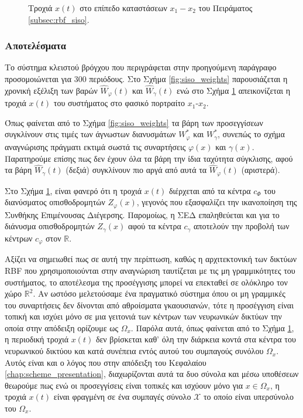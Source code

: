 {
\begin{figure}
	
	\captionsetup{format=plain}
	\caption{Τροχιά $x(t)$ στο επίπεδο καταστάσεων $x_1 - x_2$ του Πειράματος \ref{subsec:rbf_siso}.}
	\label{fig:phase_plain}	
\end{figure}

\subsubsection{Αποτελέσματα}
Το σύστημα κλειστού βρόγχου που περιγράφεται στην προηγούμενη παράγραφο προσομοιώνεται για 300 περιόδους. Στο Σχήμα \ref{fig:siso_weights} παρουσιάζεται η χρονική εξέλιξη των βαρών $\hat{W}_{\varphi}(t)$ και $\hat{W}_{\gamma}(t)$ ενώ στο Σχήμα \ref{fig:phase_plain} απεικονίζεται η τροχιά $x(t)$ του συστήματος στο φασικό πορτραίτο $x_1$-$x_2$.

Όπως φαίνεται από το Σχήμα \ref{fig:siso_weights} τα βάρη των προσεγγίσεων συγκλίνουν στις τιμές των άγνωστων διανυσμάτων $W_\varphi^*$ και $W_\gamma^*$, συνεπώς το σχήμα αναγνώρισης πράγματι εκτιμά σωστά τις συναρτήσεις $\varphi(x)$ και $\gamma(x)$. Παρατηρούμε επίσης πως δεν έχουν όλα τα βάρη την ίδια ταχύτητα σύγκλισης, αφού τα βάρη $\hat{W}_{\gamma}(t)$ (δεξιά) συγκλίνουν πιο αργά από αυτά τα $\hat{W}_{\varphi}(t)$ (αριστερά).

}

Στο Σχήμα \ref{fig:phase_plain}, είναι φανερό ότι η τροχιά $x(t)$ διέρχεται από τα κέντρα $c_\Phi$ του διανύσματος οπισθοδρομητών $Z_\varphi(x)$, γεγονός που εξασφαλίζει την ικανοποίηση της Συνθήκης Επιμένουσας Διέγερσης. Παρομοίως, η ΣΕΔ επαληθεύεται και για το διάνυσμα οπισθοδρομητών $Z_\gamma(x)$ αφού τα κέντρα $c_\gamma$ αποτελούν την προβολή των κέντρων $c_\varphi$ στον $\mathbb{R}$.

Αξίζει να σημειωθεί πως σε αυτή την περίπτωση, καθώς η αρχιτεκτονική των δικτύων RBF που χρησιμοποιούνται στην αναγνώριση ταυτίζεται με τις μη γραμμικότητες του συστήματος, το αποτέλεσμα της προσέγγισης μπορεί να επεκταθεί σε ολόκληρο τον χώρο $\mathbb{R}^2$. Αν ωστόσο μελετούσαμε ένα πραγματικό σύστημα όπου οι μη γραμμικές του συναρτήσεις δεν δίνονται από αθροίσματα γκαουσιανών, τότε η προσέγγιση είναι τοπική και ισχύει μόνο σε μια γειτονιά των κέντρων των νευρωνικών δικτύων την οποία στην απόδειξη ορίζουμε ως $\Omega_x$. Παρόλα αυτά, όπως φαίνεται από το Σχήμα \ref{fig:phase_plain}, η περιοδική τροχιά $x(t)$ δεν βρίσκεται καθ' όλη την διάρκεια κοντά στα κέντρα του νευρωνικού δικτύου και κατά συνέπεια εντός αυτού του συμπαγούς συνόλου $\Omega_x$. Αυτός είναι και ο λόγος που στην απόδειξη του Κεφαλαίου \ref{chap:scheme_presentation}, διαχωρίζονται αυτά τα δυο σύνολα και μέσω υποθέσεων θεωρούμε πως ενώ οι προσεγγίσεις είναι τοπικές και ισχύουν μόνο για $x \in \Omega_x$, η τροχιά $x(t)$ είναι φραγμένη σε ένα συμπαγές σύνολο $\mathcal{X}$ το οποίο είναι υπερσύνολο του $\Omega_x$.


